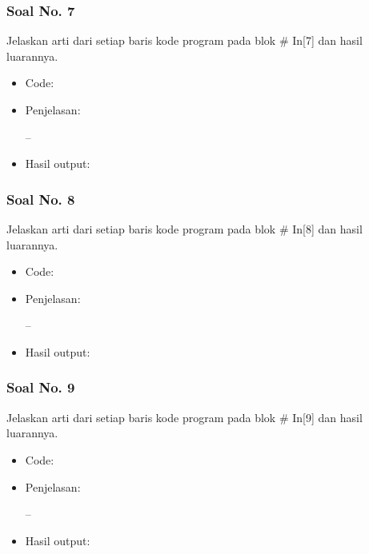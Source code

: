 \subsubsection{Soal No. 7}
Jelaskan arti dari setiap baris kode program pada blok \# In[7] dan hasil luarannya.

\begin{itemize}
\item Code:


\item Penjelasan:

--

\item Hasil output:

\end{itemize}

\subsubsection{Soal No. 8}
Jelaskan arti dari setiap baris kode program pada blok \# In[8] dan hasil luarannya.

\begin{itemize}
\item Code:


\item Penjelasan:

--

\item Hasil output:

\end{itemize}

\subsubsection{Soal No. 9}
Jelaskan arti dari setiap baris kode program pada blok \# In[9] dan hasil luarannya.

\begin{itemize}
\item Code:


\item Penjelasan:

--

\item Hasil output:

\end{itemize}

